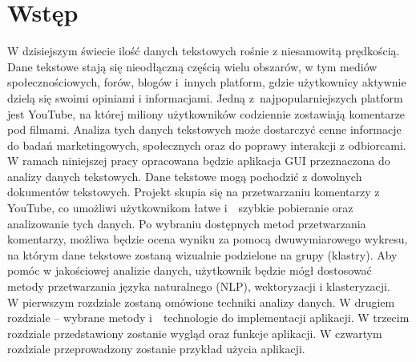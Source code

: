 \chapter*{Wstęp}

W dzisiejszym świecie ilość danych tekstowych rośnie z niesamowitą prędkością. Dane tekstowe stają się nieodłączną częścią wielu obszarów, w tym mediów społecznościowych, forów, blogów i~innych platform, gdzie użytkownicy aktywnie dzielą się swoimi opiniami i informacjami. Jedną z~najpopularniejszych platform jest YouTube, na której miliony użytkowników codziennie zostawiają komentarze pod filmami. Analiza tych danych tekstowych może dostarczyć cenne informacje do badań marketingowych, społecznych oraz do poprawy interakcji z odbiorcami.\\


W ramach niniejszej pracy opracowana będzie aplikacja GUI przeznaczona do analizy danych tekstowych. Dane tekstowe mogą pochodzić z dowolnych dokumentów tekstowych. Projekt skupia się na przetwarzaniu komentarzy z YouTube, co umożliwi użytkownikom łatwe i~~szybkie pobieranie oraz analizowanie tych danych. Po wybraniu dostępnych metod przetwarzania komentarzy, możliwa będzie ocena wyniku za pomocą dwuwymiarowego wykresu, na którym dane tekstowe zostaną wizualnie podzielone na grupy (klastry). Aby pomóc w jakościowej analizie danych, użytkownik będzie mógł dostosować metody przetwarzania języka naturalnego (NLP), wektoryzacji i klasteryzacji.\\


W pierwszym rozdziale zostaną omówione techniki analizy danych. W drugiem rozdziale -- wybrane metody i~~technologie do implementacji aplikacji. W trzecim rozdziale przedstawiony zostanie wygląd oraz funkcje aplikacji. W czwartym rozdziale przeprowadzony zostanie przykład użycia aplikacji.








